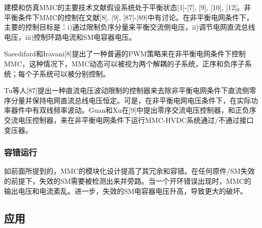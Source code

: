   建模和仿真MMC的主要技术文献假设系统处于平衡状态[1]-[7], [9], [10], [12]。非平衡条件下MMC的控制在文献[8], [9], [87]-[89]中有讨论。在非平衡电网条件下，主要的控制目标是：i)通过限制负序分量来平衡交流侧电压，ii)调节电网直流总线电压，iii)控制环路电流和SM电容器电压。
  
  Saeedifard和Iravani[8]提出了一种普遍的PWM策略来在非平衡电网条件下控制MMC，这种情况下，MMC动态可以被视为两个解耦的子系统，正序和负序子系统；每个子系统可以被分别控制。
  
  Tu等人[87]提出一种直流电压波动限制的控制器来去除非平衡电网条件下直流侧零序分量并保持电网直流总线电压恒定。可是，在非平衡电网电压条件下，在实际功率器件中有双线频率波动。Guan和Xu在[9]中提出零序交流电压控制器，和正负序交流电压控制器，来在非平衡电网条件下运行MMC-HVDC系统通过/不通过接口变压器。
  
  \subsubsection{容错运行}
  
  如前面所提到的，MMC的模块化设计提高了其冗余和容错。在任何原件/SM失效的前提下，失效的SM需要被检测出来并旁路。当一个开环错误出现时，MMC的输出电压和电流紊乱。进一步，失效的SM电容器电压升高，导致更大的破坏。
  
  \subsection{应用}
  
